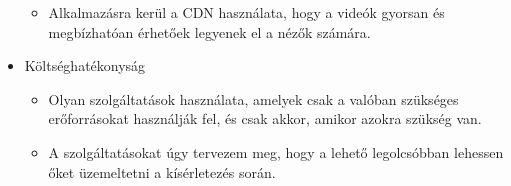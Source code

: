 \begin{itemize}
\begin{itemize}
    \item Alkalmazásra kerül a CDN használata, hogy a videók gyorsan és megbízhatóan érhetőek legyenek el a nézők számára.
  \end{itemize}
  \item Költséghatékonyság
  \begin{itemize}
    \item Olyan szolgáltatások használata, amelyek csak a valóban szükséges erőforrásokat használják fel, és csak akkor, amikor azokra szükség van.
    \item A szolgáltatásokat úgy tervezem meg, hogy a lehető legolcsóbban lehessen őket üzemeltetni a kísérletezés során.
  \end{itemize}
\end{itemize}
